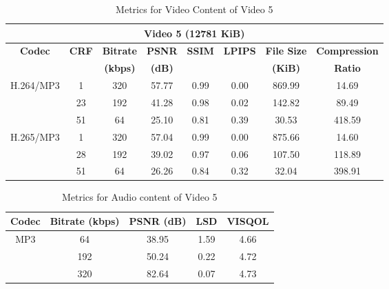     \begin{table}[H]
        \centering
        \caption{Metrics for Video Content of Video 5}
        \label{table:vid-met-5}
        \begin{tabular}{|c|c|c|c|c|c|c|c|}
        \hline
        \multicolumn{8}{|c|}{\textbf{Video 5 (12781 KiB)}} \\ \hline
        \multirow{2}{*}{\textbf{Codec}} & \multirow{2}{*}{\textbf{CRF}} & \textbf{Bitrate} & \textbf{PSNR} & \textbf{SSIM} & \textbf{LPIPS} & \textbf{File Size} & \textbf{Compression} \\ 
        &  & \textbf{(kbps)} & \textbf{(dB)} &  &  & \textbf{(KiB)} & \textbf{Ratio} \\ \hline
        \multirow{3}{*}{H.264/MP3} & 1  & 320 & 57.77 & 0.99 & 0.00 & 869.99  & 14.69 \\ \cline{2-8} 
                                    & 23 & 192 & 41.28 & 0.98 & 0.02 & 142.82  & 89.49 \\ \cline{2-8} 
                                    & 51 & 64  & 25.10 & 0.81 & 0.39 & 30.53   & 418.59 \\ \hline
        \multirow{3}{*}{H.265/MP3} & 1  & 320 & 57.04 & 0.99 & 0.00 & 875.66  & 14.60 \\ \cline{2-8} 
                                    & 28 & 192 & 39.02 & 0.97 & 0.06 & 107.50  & 118.89 \\ \cline{2-8} 
                                    & 51 & 64  & 26.26 & 0.84 & 0.32 & 32.04   & 398.91 \\ \hline
        \end{tabular}
    \end{table}
    

    \begin{table}[H]
        \centering
        \caption{Metrics for Audio content of Video 5}
        \label{table:aud-met-5}
        \begin{tabular}{|c|c|c|c|c|}
        \hline
        \textbf{Codec} & \textbf{Bitrate (kbps)} & \textbf{PSNR (dB)} & \textbf{LSD} & \textbf{VISQOL} \\ \hline
        \multirow{3}{*}{MP3} & 64  & 38.95 & 1.59 & 4.66 \\ \cline{2-5} 
                                   & 192 & 50.24 & 0.22 & 4.72 \\ \cline{2-5} 
                                   & 320 & 82.64 & 0.07 & 4.73 \\ \hline
        \end{tabular}
    \end{table}
    
